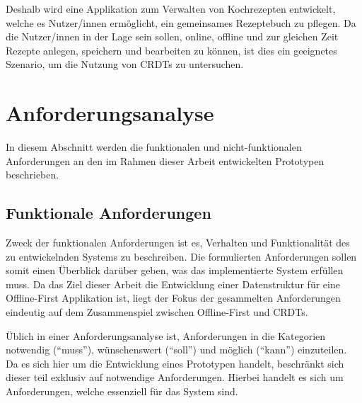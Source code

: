 \documentclass[a4paper, 12pt]{scrreprt}
\begin{document}
Deshalb wird eine Applikation zum Verwalten von Kochrezepten entwickelt, welche es Nutzer/innen ermöglicht, ein gemeinsames Rezeptebuch zu pflegen. Da die Nutzer/innen in der Lage sein sollen, online, offline und zur gleichen Zeit Rezepte anlegen, speichern und bearbeiten zu können, ist dies ein geeignetes Szenario, um die Nutzung von \acp{CRDT} zu untersuchen. 

\section{Anforderungsanalyse}
\label{sec:anforderungsanalyse}

In diesem Abschnitt werden die funktionalen und nicht-funktionalen Anforderungen an den im Rahmen dieser Arbeit entwickelten Prototypen beschrieben.

\subsection{Funktionale Anforderungen}
\label{sec:funktionaleAnforderungen}
Zweck der funktionalen Anforderungen ist es, Verhalten und Funktionalität des zu entwickelnden Systems zu beschreiben. Die formulierten Anforderungen sollen somit einen Überblick darüber geben, was das implementierte System erfüllen muss. Da das Ziel dieser Arbeit die Entwicklung einer Datenstruktur für eine Offline-First Applikation ist, liegt der Fokus der gesammelten Anforderungen eindeutig auf dem Zusammenspiel zwischen Offline-First und \acp{CRDT}.

Üblich in einer Anforderungsanalyse ist, Anforderungen in die Kategorien notwendig (\enquote{muss}), wünschenswert (\enquote{soll}) und möglich (\enquote{kann}) einzuteilen. Da es sich hier um die Entwicklung eines Prototypen handelt, beschränkt sich dieser teil exklusiv auf notwendige Anforderungen. Hierbei handelt es sich um Anforderungen, welche essenziell für das System sind.
\end{document}
